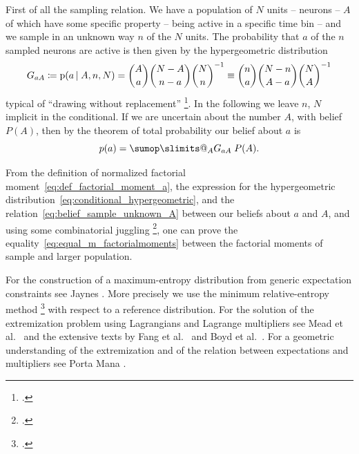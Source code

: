 \documentclass[\ifafour a4paper,12pt,\else a5paper,10pt,\fi%
onecolumn,oneside,article,%
british%
]{memoir}
\makeatletter
\theoremstyle{remark}
\theoremstyle{innote}
\def\sum{\DOTSI\sumop\slimits@}
\newcommand*{\citep}{\footcites}
\newcommand*{\citey}{\parencites*}
\newcommand*{\defd}{\coloneqq}
\newcommand*{\pf}{\mathrm{p}}%
\renewcommand*{\|}{\nonscript\,\vert\nonscript\;\mathopen{}}
\newcommand*{\sect}{\S}%
\newcommand*{\sects}{\S\S}%
\newcommand*{\chap}{ch.}%
\newcommand*{\chaps}{chs}%
\newcommand*{\etal}{{et al.}}
\newcommand*{\yG}{G}
\newcommand*{\yAv}{A}
\newcommand*{\yav}{a}
\newcommand*{\ya}{\yav}%
\newcommand*{\yA}{\yAv}%
\makeatother
\begin{document}
First of all the sampling relation. We have a population of $N$ units --
neurons -- $\yA$ of which have some specific property -- being active in a
specific time bin -- and we sample in an unknown way $n$ of the $N$ units.
The probability that $\ya$ of the $n$ sampled neurons are active is then
given by the hypergeometric distribution
\begin{equation}
  \label{eq:conditional_hypergeometric}
  \yG_{\ya\yA} \defd \pf(\ya \|\yA, n,N)=
  \binom{\yA}{\ya}\binom{N-\yA}{n-\ya}\binom{N}{n}^{-1}
\equiv  \binom{n}{\ya}\binom{N-n}{\yA-\ya}\binom{N}{\yA}^{-1}
\end{equation}
typical of \enquote{drawing without replacement}
\citep[\chap~3]{jaynes1994_r2003}[\sect~4.8.3]{ross1976_r2010}[\sect~II.6]{feller1950_r1968}[\sects~2.1,
3.2]{jeffreys1939_r1983}. In the following we leave $n$, $N$ implicit in
the conditional. If we are uncertain about the number $\yA$, with belief
$P(\yA)$, then by the theorem of total probability our belief about $\ya$
is
\begin{equation}
  \label{eq:belief_sample_unknown_A}
  p(\ya)= \sum_{\yA} \yG_{\ya\yA} \;P(\yA).
\end{equation}

From the definition of normalized factorial
moment~\eqref{eq:def_factorial_moment_a}, the expression for the
hypergeometric distribution~\eqref{eq:conditional_hypergeometric}, and the
relation~\eqref{eq:belief_sample_unknown_A} between our beliefs about $\ya$
and $\yA$, and using some combinatorial juggling
\citep[\chaps~I--IV]{whitworth1867_r1965}[\chap~II]{feller1950_r1968}[appendix~A]{portamanaetal2015}{potts1953}, one
can prove the equality~\eqref{eq:equal_m_factorialmoments} between the
factorial moments of sample and larger population.

\bigskip

For the construction of a maximum-entropy distribution from generic
expectation constraints see Jaynes
\citey{jaynes1963}[\chap~11]{jaynes1994_r2003}. More precisely we use the
minimum relative-entropy method
\citep{hobsonetal1973,csiszar1985}[\sect~5.2.2]{sivia1996_r2006} with
respect to a reference distribution. For the solution of the extremization
problem using Lagrangians and Lagrange multipliers see Mead \etal\
\citey{meadetal1984} and the extensive texts by Fang \etal\
\citey{fangetal1997} and Boyd \etal\ \citey{boydetal2004_r2009}. For a
geometric understanding of the extremization and of the relation between
expectations and multipliers see Porta Mana \citey{portamana2017b}.
\end{document}
